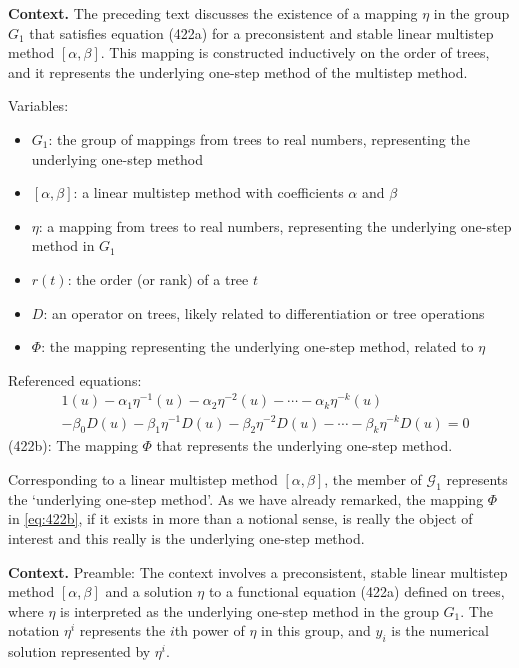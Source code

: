 \noindent\textbf{Context.}
The preceding text discusses the existence of a mapping $\eta$ in the group $G_1$ that satisfies equation (422a) for a preconsistent and stable linear multistep method $[\alpha, \beta]$. This mapping is constructed inductively on the order of trees, and it represents the underlying one-step method of the multistep method.

Variables:
\begin{itemize}
    \item $G_1$: the group of mappings from trees to real numbers, representing the underlying one-step method
    \item $[\alpha, \beta]$: a linear multistep method with coefficients $\alpha$ and $\beta$
    \item $\eta$: a mapping from trees to real numbers, representing the underlying one-step method in $G_1$
    \item $r(t)$: the order (or rank) of a tree $t$
    \item $D$: an operator on trees, likely related to differentiation or tree operations
    \item $\Phi$: the mapping representing the underlying one-step method, related to $\eta$
\end{itemize}

Referenced equations:
\begin{align}
    &1(u) - \alpha_1 \eta^{-1}(u) - \alpha_2 \eta^{-2}(u) - \cdots - \alpha_k \eta^{-k}(u) \nonumber \\
    &- \beta_0 D(u) - \beta_1 \eta^{-1} D(u) - \beta_2 \eta^{-2} D(u) - \cdots - \beta_k \eta^{-k} D(u) = 0 \tag{422a}
\end{align}
(422b): The mapping $\Phi$ that represents the underlying one-step method.

\begin{definition}

  \label{def:422B}
Corresponding to a linear multistep method $[\alpha, \beta]$, the member of $\mathcal{G}_1$ represents the `underlying one-step method'.  
As we have already remarked, the mapping $\Phi$ in \eqref{eq:422b}, if it exists in more than a notional sense, is really the object of interest and this really is the underlying one-step method.
\end{definition}

\noindent\textbf{Context.}
Preamble: The context involves a preconsistent, stable linear multistep method $[\alpha, \beta]$ and a solution $\eta$ to a functional equation (422a) defined on trees, where $\eta$ is interpreted as the underlying one-step method in the group $G_1$. The notation $\eta^i$ represents the $i$th power of $\eta$ in this group, and $y_i$ is the numerical solution represented by $\eta^i$.

